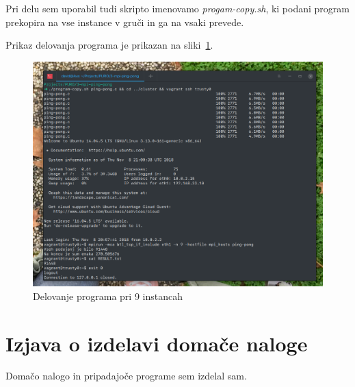 \documentclass[a4paper,11pt]{article}
\begin{document}


Pri delu sem uporabil tudi skripto imenovamo \textit{progam-copy.sh}, ki podani program prekopira na vse instance v gruči in ga na vsaki prevede.



Prikaz delovanja programa je prikazan na sliki~\ref{slika1}.


\begin{figure}
\begin{center}
\includegraphics[scale=0.5]{./proof.png}
\caption{Delovanje programa pri 9 instancah}
\label{slika1}
\end{center}
\end{figure}

\section{Izjava o izdelavi domače naloge}
Domačo nalogo in pripadajoče programe sem izdelal sam.
\end{document}
